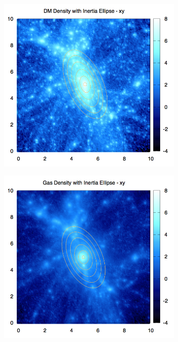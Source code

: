 \documentclass[journal]{IEEEtran}
\begin{document}
\begin{figure}[!t]
\centering
	\begin{subfigure}[t]{0.3\textwidth}
		\centering
		\includegraphics[width=\linewidth]{DMDenEllipxy.png}
	\end{subfigure}
	\quad
	\begin{subfigure}[t]{0.3\textwidth}
		\centering
		\includegraphics[width=\linewidth]{GasDenEllipxy.png}

\end{subfigure}
\end{figure}
\end{document}
